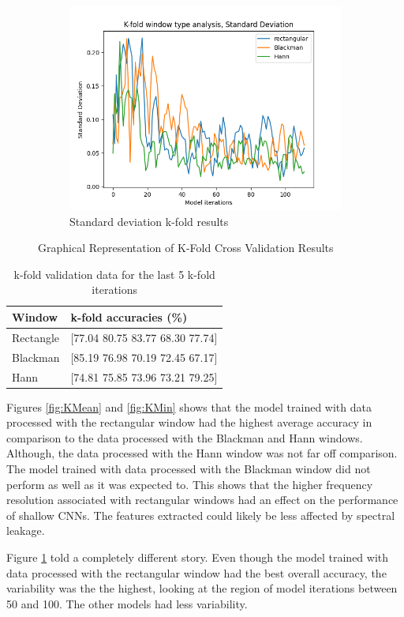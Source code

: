 \begin{figure}[hbt!]
\begin{subfigure}[b]{0.5\textwidth}
        \includegraphics[width=\linewidth]{Images/kfoldStandard Deviation.png}
        \caption{Standard deviation k-fold results}
        \label{fig:KStd}
    \end{subfigure}
    \caption{Graphical Representation of K-Fold Cross Validation Results}
    \label{fig:K-Fold}
\end{figure}
 
\begin{table}[h]
\centering
\begin{tabular}{|l|l|}
\hline
\textbf{Window} & \textbf{k-fold accuracies (\%)} \\
\hline
Rectangle & [77.04 80.75 83.77 68.30 77.74] \\
Blackman & [85.19 76.98 70.19 72.45 67.17] \\
Hann & [74.81 75.85 73.96 73.21 79.25] \\
\hline
\end{tabular}
\caption{k-fold validation data for the last 5 k-fold iterations}
\label{tab:k-fold-average}
\end{table}

Figures \ref{fig:KMean} and \ref{fig:KMin} shows that the model trained with data processed with the rectangular window had the highest average accuracy in comparison to the data processed with the Blackman and Hann windows. Although, the data processed with the Hann window was not far off comparison. The model trained with data processed with the Blackman window did not perform as well as it was expected to. This shows that the higher frequency resolution associated with rectangular windows had an effect on the performance of shallow CNNs. The features extracted could likely be less affected by spectral leakage. 

Figure \ref{fig:KStd} told a completely different story. Even though the model trained with data processed with the rectangular window had the best overall accuracy, the variability was the the highest, looking at the region of model iterations between 50 and 100. The other models had less variability. 

% 
% 
